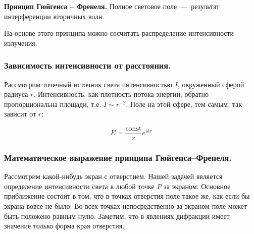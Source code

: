 \documentclass[12pt,a4paper]{article}
\numberwithin{equation}{section}
\numberwithin{equation}{section}
\newcommand{\const}{\mathrm{const}}
\begin{document}
\textbf{Принцип Гюйгенса -- Френеля.} Полное световое поле~---~результат интерференции вторичных волн.

На основе этого принципа можно сосчитать распределение интенсивности излучения. 

\subsubsection{Зависимость интенсивности от расстояния.}
\label{sec:intensity_distance}

Рассмотрим точечный источник света интенсивностью $I$, окруженный
сферой радиуса $r$. Интенсивность, как плотность потока энергии,
обратно пропорциональна площади, т.е. $I \sim r^{-2}$. Поле на этой
сфере, тем самым, так зависит от $r$:

\begin{equation}
E = \frac{\const}{r} e^{i k r}
\end{equation}

\subsubsection{Математическое выражение принципа Гюйгенса--Френеля.}

Рассмотрим какой-нибудь экран с отверстием. Нашей задачей является
определение интенсивности света в любой точке $P$ за экраном. Основное
приближение состоит в том, что в точках отверстия поле такое же, как
если бы экрана вовсе не было. Во всех точках непосредственно за
экраном поле может быть положено равным нулю. Заметим, что в явлениях
дифракции имеет значение только форма края отверстия.

\begin{figure}
  \begin{center}
  \end{center}
  \label{fig:huygens_fresnel}
\end{figure}
\end{document}
